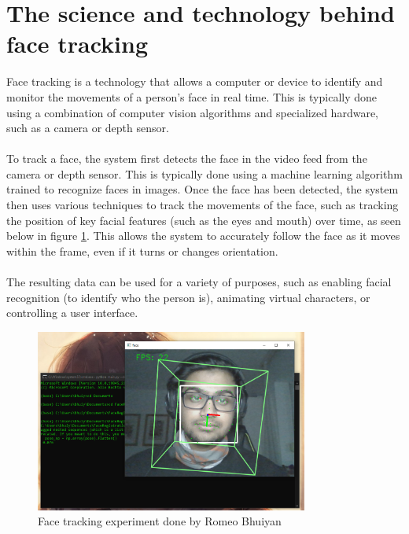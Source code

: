 \section{The science and technology behind face tracking}
Face tracking is a technology that allows a computer or device to identify
and monitor the movements of a person's face in real time. 
This is typically done using a combination of computer vision 
algorithms and specialized hardware, such as a camera or depth sensor. \cite{book2}
\\
\\
To track a face, the system first detects the face in 
the video feed from the camera or depth sensor. This is 
typically done using a machine learning algorithm trained to 
recognize faces in images. Once the face has been detected, 
the system then uses various techniques to track the movements 
of the face, such as tracking the position of key facial features
(such as the eyes and mouth) over time, as seen below in figure \ref{fig:facetracking}.
 This allows the system to accurately follow the face as it moves within the frame, even if it 
turns or changes orientation.
\\
\\
The resulting data can be used for a variety of 
purposes, such as enabling facial recognition 
(to identify who the person is), animating virtual characters, 
or controlling a user interface.
\\
\begin{figure}[htb]
    \centering
    \includegraphics[width=0.8\textwidth]{pics/bhuiyanfracetracking.png}
    \caption{Face tracking experiment done by Romeo Bhuiyan}
    \label{fig:facetracking}
\end{figure}



